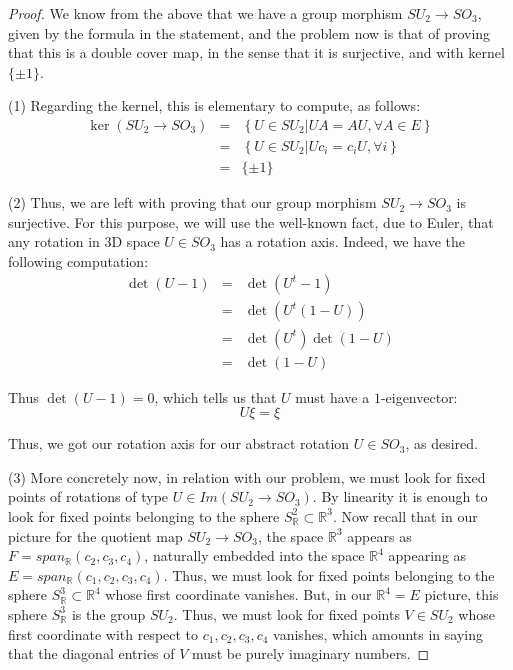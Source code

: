 \documentclass[12pt]{amsbook}
\begin{document}
\begin{proof}
We know from the above that we have a group morphism $SU_2\to SO_3$, given by the formula in the statement, and the problem now is that of proving that this is a double cover map, in the sense that it is surjective, and with kernel $\{\pm1\}$.

\medskip

(1) Regarding the kernel, this is elementary to compute, as follows:
\begin{eqnarray*}
\ker(SU_2\to SO_3)
&=&\left\{U\in SU_2\Big|UA=AU,\forall A\in E\right\}\\
&=&\left\{U\in SU_2\Big|Uc_i=c_iU,\forall i\right\}\\
&=&\{\pm1\}
\end{eqnarray*}

(2) Thus, we are left with proving that our group morphism $SU_2\to SO_3$ is surjective. For this purpose, we will use the well-known fact, due to Euler, that any rotation in 3D space $U\in SO_3$ has a rotation axis. Indeed, we have the following computation:
\begin{eqnarray*}
\det(U-1)
&=&\det(U^t-1)\\
&=&\det(U^t(1-U))\\
&=&\det(U^t)\det(1-U)\\
&=&\det(1-U)
\end{eqnarray*}

Thus $\det(U-1)=0$, which tells us that $U$ must have a $1$-eigenvector:
$$U\xi=\xi$$

Thus, we got our rotation axis for our abstract rotation $U\in SO_3$, as desired. 

\medskip

(3) More concretely now, in relation with our problem, we must look for fixed points of rotations of type $U\in Im(SU_2\to SO_3)$. By linearity it is enough to look for fixed points belonging to the sphere $S^2_\mathbb R\subset\mathbb R^3$. Now recall that in our picture for the quotient map $SU_2\to SO_3$, the space $\mathbb R^3$ appears as $F=span_\mathbb R(c_2,c_3,c_4)$, naturally embedded into the space $\mathbb R^4$ appearing as $E=span_\mathbb R(c_1,c_2,c_3,c_4)$. Thus, we must look for fixed points belonging to the sphere $S^3_\mathbb R\subset\mathbb R^4$ whose first coordinate vanishes. But, in our $\mathbb R^4=E$ picture, this sphere $S^3_\mathbb R$ is the group $SU_2$. Thus, we must look for fixed points $V\in SU_2$ whose first coordinate with respect to $c_1,c_2,c_3,c_4$ vanishes, which amounts in saying that the diagonal entries of $V$ must be purely imaginary numbers.


\end{proof}
\end{document}
